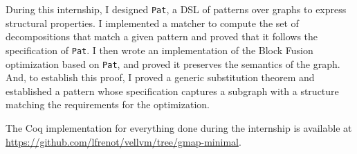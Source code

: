 \documentclass[11pt]{article}
\newcommand{\pat}{\texttt{Pat}\xspace}
\begin{document}
During this internship, I designed \pat, a DSL of patterns over graphs to express structural properties. I implemented a matcher to compute the set of decompositions that match a given pattern and proved that it follows the specification of \pat.
I then wrote an implementation of the Block Fusion optimization based on \pat, and proved it preserves the semantics of the graph. And, to establish this proof, I proved a generic substitution theorem and established a pattern whose specification captures a subgraph with a structure matching the requirements for the optimization.

The Coq implementation for everything done during the internship is available at \url{https://github.com/lfrenot/vellvm/tree/gmap-minimal}.

\printbibliography
\end{document}
